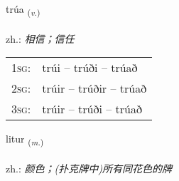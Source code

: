 \documentclass[frontgrid, backgrid]{flacards}\usepackage[]{graphicx}\usepackage[]{xcolor}
\begin{document}
\renewcommand{\blhead}{\vskip5pt {\small\bfseries\footnotesize Sagnorð | 动词 }}
\renewcommand{\bcfoot}{\vskip5pt \hspace{2pt}{\small\bfseries\footnotesize 1K}}


{trúa \small{\textsubscript{(\textit{v.})}} \\[1ex] %
\textphonetic{[tʰruːa]} \\
zh.: \emph{相信；信任} \\  [2ex]
\renewcommand*{\arraystretch}{0.8}
\begin{tabular}{p{1cm}l}
\textsc{1sg}: & trúi -- trúði -- trúað \\ 
\textsc{2sg}: & trúir -- trúðir -- trúað \\ 
\textsc{3sg}: & trúir -- trúði -- trúað \\ 
\end{tabular}
}

\renewcommand{\flhead}{\vskip5pt \fboxsep=0pt {\small\bfseries\footnotesize Nafnorð | 名词}}
\renewcommand{\fcfoot}{\vskip5pt \fboxsep=0pt \hspace{2pt}{\small\bfseries\footnotesize 1K}}

\renewcommand{\blhead}{\vskip5pt {\small\bfseries\footnotesize Nafnorð | 名词 }}
\renewcommand{\bcfoot}{\vskip5pt \hspace{2pt}{\small\bfseries\footnotesize 1K}}


{litur \small{\textsubscript{(\textit{m.})}} \\[1ex] %
\textphonetic{[lɪːtʏr]} \\
zh.: \emph{颜色；(扑克牌中)所有同花色的牌} \\  [2ex]
\renewcommand*{\arraystretch}{0.8}
}

\renewcommand{\flhead}{\vskip5pt \fboxsep=0pt {\small\bfseries\footnotesize Nafnorð | 名词}}
\renewcommand{\fcfoot}{\vskip5pt \fboxsep=0pt \hspace{2pt}{\small\bfseries\footnotesize 1K}}
\end{document}
